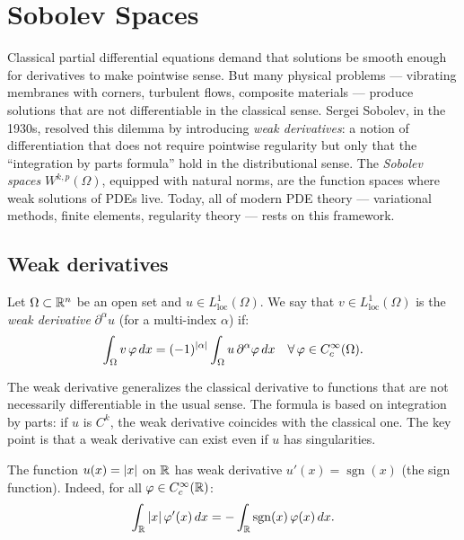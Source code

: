 \chapter{Sobolev Spaces}
\label{ch:sobolev}

Classical partial differential equations demand that solutions be smooth enough for derivatives to make pointwise sense. But many physical problems --- vibrating membranes with corners, turbulent flows, composite materials --- produce solutions that are not differentiable in the classical sense. Sergei Sobolev, in the 1930s, resolved this dilemma by introducing \emph{weak derivatives}: a notion of differentiation that does not require pointwise regularity but only that the ``integration by parts formula'' hold in the distributional sense. The \emph{Sobolev spaces} $W^{k,p}(\Omega)$, equipped with natural norms, are the function spaces where weak solutions of PDEs live. Today, all of modern PDE theory --- variational methods, finite elements, regularity theory --- rests on this framework.

\section{Weak derivatives}

\begin{definition}
Let $\Omega \subset \mathbb{R}^n$ be an open set and $u \in L^1_{\mathrm{loc}}(\Omega)$.
We say that $v \in L^1_{\mathrm{loc}}(\Omega)$ is the \emph{weak derivative}
$\partial^\alpha u$ (for a multi-index $\alpha$) if:
\[
    \int_\Omega v\, \varphi\, dx = (-1)^{\left| \alpha \right|} \int_\Omega u\, \partial^\alpha \varphi\, dx
    \quad \forall\, \varphi \in C_c^\infty(\Omega).
\]
\end{definition}

\begin{intuition}
The weak derivative generalizes the classical derivative to functions that are not
necessarily differentiable in the usual sense. The formula is based on integration
by parts: if $u$ is $C^k$, the weak derivative coincides with the classical one.
The key point is that a weak derivative can exist even if $u$ has singularities.
\end{intuition}

\begin{example}
The function $u(x) = \left| x \right|$ on $\mathbb{R}$ has weak derivative
$u'(x) = \operatorname{sgn}(x)$ (the sign function). Indeed, for all
$\varphi \in C_c^\infty(\mathbb{R})$:
\[
    \int_{\mathbb{R}} \left| x \right| \varphi'(x)\, dx = -\int_{\mathbb{R}} \operatorname{sgn}(x)\, \varphi(x)\, dx.
\]
\end{example}

